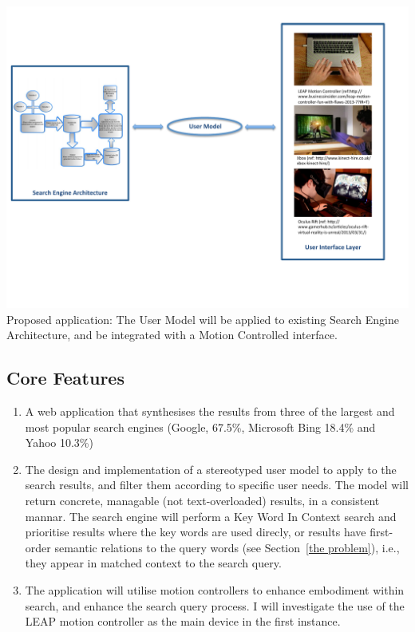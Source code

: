 \documentclass[10pt]{article}
\begin{document}
\begin{center}
\includegraphics[scale=0.7]{searchEngArchi}
Proposed application: The User Model will be applied to existing Search Engine Architecture\cite{seimage}, and be integrated with a Motion Controlled interface.
\end{center}


\subsection{Core Features}
\begin{enumerate}
\item  A web application that synthesises the results from three of the largest and most popular search engines (Google, 67.5\%, Microsoft Bing 18.4\% and Yahoo 10.3\%) \cite{adam}

\item The design and implementation of a stereotyped user model to apply to the search results, and filter them according to specific user needs. The model will return concrete, managable (not text-overloaded) results, in a consistent mannar. The search engine will perform a Key Word In Context search and prioritise results where the key words are used direcly, or results have first-order semantic relations to the query words (see Section~\ref{the problem}), i.e., they appear in matched context to the search query.

\item The application will utilise motion controllers to enhance embodiment within search, and enhance the search query process. I will investigate the use of the LEAP motion controller as the main device in the first instance.
\end{enumerate}
\end{document}
